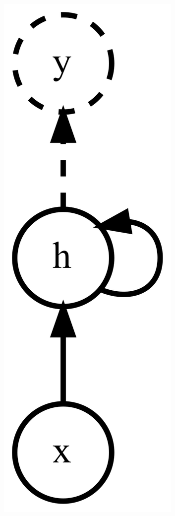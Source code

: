 \documentclass{beamer}
\begin{document}
\begin{frame}
\begin{columns}
\begin{column}{0.3\textwidth}
\begin{center}
        \includegraphics[height=0.6\textheight]{../img/recurrent-nn.png}
      \end{center}
    \end{column}
    \begin{column}{0.7\textwidth}

\end{column}
\end{columns}
\end{frame}
\end{document}
